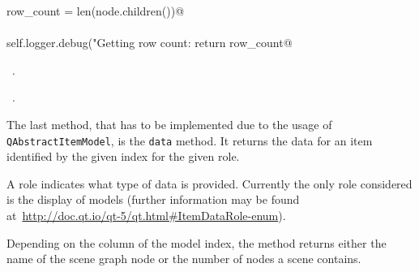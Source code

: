\documentclass[
    a4paper,      %
    10pt,         %
    openright,    %
    notitlepage,  %
    parskip=half, %
]{scrreprt}       %
\theoremstyle{definition}                    %
\begin{document}
\begin{flushleft}
\begin{minipage}{\linewidth}
\begin{list}{}{}
\mbox{}\lstinline@            row_count = len(node.children())@\\
\mbox{}\lstinline@@\\
\mbox{}\lstinline@    self.logger.debug("Getting row count: %s", row_count)@\\
\mbox{}\lstinline@    return row_count@\\
\mbox{}\lstinline@@{\NWsep}
\end{list}
\vspace{-1.5ex}
\footnotesize
\begin{list}{}{\setlength{\itemsep}{-\parsep}\setlength{\itemindent}{-\leftmargin}}
\item \NWtxtMacroDefBy\ .
\item \NWtxtMacroRefIn\ .

\item{}
\end{list}
\end{minipage}\vspace{4ex}
\end{flushleft}
The last method, that has to be implemented due to the usage of
\verb+QAbstractItemModel+, is the \verb+data+ method. It returns the data for an
item identified by the given index for the given role.

A role indicates what type of data is provided. Currently the only role
considered is the display of models (further information may be found
at~\url{http://doc.qt.io/qt-5/qt.html#ItemDataRole-enum}).

Depending on the column of the model index, the method returns either the name
of the scene graph node or the number of nodes a scene contains.
\end{document}
